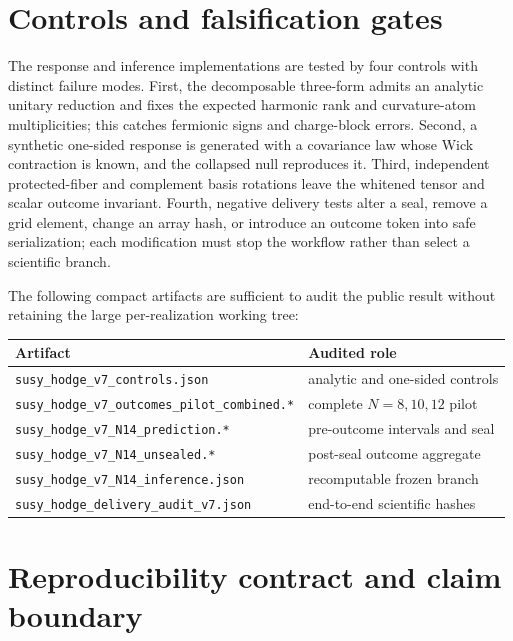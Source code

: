 \documentclass[aps,prl,onecolumn,superscriptaddress,longbibliography,floatfix]{revtex4-2}
\begin{document}
\section{Controls and falsification gates}
\label{sec:supp-controls}

The response and inference implementations are tested by four controls with distinct failure modes. First, the decomposable three-form admits an analytic unitary reduction and fixes the expected harmonic rank and curvature-atom multiplicities; this catches fermionic signs and charge-block errors. Second, a synthetic one-sided response is generated with a covariance law whose Wick contraction is known, and the collapsed null reproduces it. Third, independent protected-fiber and complement basis rotations leave the whitened tensor and scalar outcome invariant. Fourth, negative delivery tests alter a seal, remove a grid element, change an array hash, or introduce an outcome token into safe serialization; each modification must stop the workflow rather than select a scientific branch.

The following compact artifacts are sufficient to audit the public result without retaining the large per-realization working tree:
\begin{center}
\begin{tabular}{@{}l@{\hspace{1.2em}}l@{}}
\toprule
Artifact & Audited role \\
\midrule
\texttt{susy\_hodge\_v7\_controls.json} & analytic and one-sided controls \\
\texttt{susy\_hodge\_v7\_outcomes\_pilot\_combined.*} & complete \(N=8,10,12\) pilot \\
\texttt{susy\_hodge\_v7\_N14\_prediction.*} & pre-outcome intervals and seal \\
\texttt{susy\_hodge\_v7\_N14\_unsealed.*} & post-seal outcome aggregate \\
\texttt{susy\_hodge\_v7\_N14\_inference.json} & recomputable frozen branch \\
\texttt{susy\_hodge\_delivery\_audit\_v7.json} & end-to-end scientific hashes \\
\bottomrule
\end{tabular}
\end{center}

\section{Reproducibility contract and claim boundary}
\label{sec:supp-reproducibility}
\mbox{}\par
\end{document}
